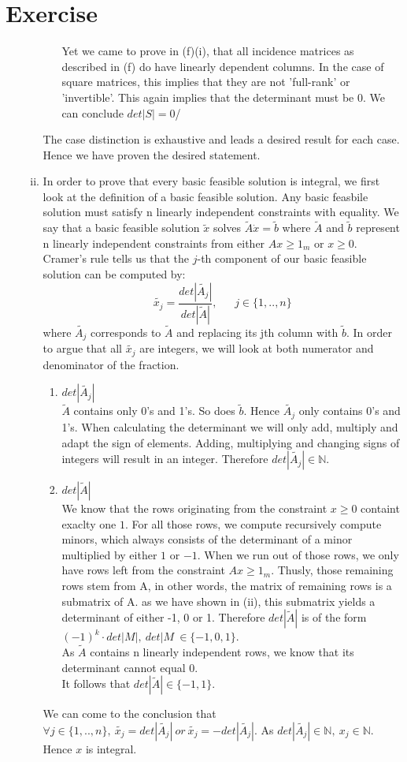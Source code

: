 \documentclass{article}
\newcounter{homeworkProblemCounter} %
\newcommand{\homeworkProblemName}{}
\newenvironment{homeworkProblem}[1][Exercise \arabic{homeworkProblemCounter}]{ %
\stepcounter{homeworkProblemCounter} %
\renewcommand{\homeworkProblemName}{#1} %
\section{\homeworkProblemName} %
}{
}
\begin{document}
\begin{homeworkProblem}
\begin{enumerate}[(a)]
\begin{enumerate}[(i)]
\begin{enumerate}[a)]
			Yet we came to prove in (f)(i), that all incidence matrices as described in (f) do have linearly dependent columns. In the case of square matrices, this implies that they are not 'full-rank' or 'invertible'. This again implies that the determinant must be 0. We can conclude \(det|S|=0 \)/
	\end{enumerate} 
	The case distinction is exhaustive and leads a desired result for each case. Hence we have proven the desired statement.
	\item 
	In order to prove that every basic feasible solution is integral, we first look at the definition of a basic feasible solution. Any basic feasbile solution must satisfy n linearly independent constraints with equality. We say that a basic feasible solution \(\tilde{x}\) solves \(\tilde{A} \dot x = \tilde{b}\) where \(\tilde{A}\) and \(\tilde{b}\) represent n linearly independent constraints from either \(Ax \geq 1_m\) or \(x \geq 0 \). \\
	Cramer's rule tells us that the \(j\)-th component of our basic feasible solution can be computed by:
	\[ \tilde{x_j} = \frac{det|\tilde{A_j}|}{det|\tilde{A}|},\ \ \ \ \ \ \  j \in \{1,..,n\}\]
	where \(\tilde{A_j}\) corresponds to \(\tilde{A}\) and replacing its jth column with \(\tilde{b}\).
	In order to argue that all \(\tilde{x_j}\) are integers, we will look at both numerator and denominator of the fraction. 
	\begin{enumerate}
		\item \(det|\tilde{A_j}|\) \\
			\(\tilde{A}\) contains only 0's and 1's. So does \(\tilde{b}\). Hence \(\tilde{A_j}\) only contains 0's and 1's. When calculating the determinant we will only add, multiply and adapt the sign of elements. Adding, multiplying and changing signs of integers will result in an integer. Therefore \(det|\tilde{A_j}| \in \mathbb{N}\).
		\item \({det|\tilde{A}|}\) \\
			We know that the rows originating from the constraint \(x \geq 0\) containt exaclty one \(1\). For all those rows, we compute recursively compute minors, which always consists of the determinant of a minor multiplied by either \(1\) or \(-1\). When we run out of those rows, we only have rows left from the constraint \(Ax \geq 1_m\). Thusly, those remaining rows stem from A, in other words, the matrix of remaining rows is a submatrix of A. as we have shown in (ii), this submatrix yields a determinant of either -1, 0 or 1. Therefore  \({det|\tilde{A}|}\) is of the form \( (-1)^k\cdot det|M|,\ det|M\ \in \{-1,0,1\}\).\\
			As \(\tilde{A}\) contains n linearly independent rows, we know that its determinant cannot equal \(0\). \\
			It follows that \({det|\tilde{A}|} \in \{-1,1\}\).
	\end{enumerate}
	We can come to the conclusion that \( \forall j \in \{1,..,n\},\ \tilde{x_j} = det|\tilde{A_j}|\ or\ \tilde{x_j} = -det|\tilde{A_j}|\). As \(det|\tilde{A_j}| \in \mathbb{N},\ x_j \in \mathbb{N}\). Hence \(x\) is integral.
	

\end{enumerate}
\end{enumerate}
\end{homeworkProblem}
\end{document}
